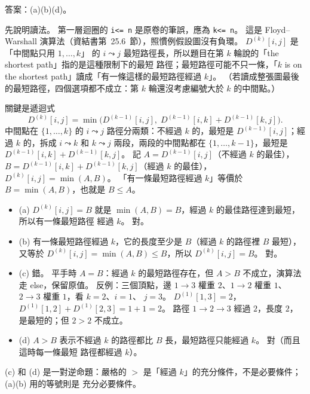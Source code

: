 \begin{pastsoln}
答案：(a)(b)(d)。

先說明讀法。 第一層迴圈的 \texttt{i<= n} 是原卷的筆誤，應為 \texttt{k<= n}。 這是 Floyd--Warshall
演算法（資結書第~25.6~節），照慣例假設圖沒有負環。 $D^{(k)}[i, j]$ 是「中間點只用 $1, \ldots, k$」
的 $i \leadsto j$ 最短路徑長，所以題目在第 $k$ 輪說的「the shortest path」指的是這種限制下的最短
路徑；最短路徑可能不只一條，「$k$ is on the shortest path」讀成「有一條這樣的最短路徑經過 $k$」。
（若讀成整張圖最後的最短路徑，四個選項都不成立：第 $k$ 輪還沒考慮編號大於 $k$ 的中間點。）

關鍵是遞迴式
\[
D^{(k)}[i, j] = \min\bigl(D^{(k-1)}[i, j],\; D^{(k-1)}[i, k] + D^{(k-1)}[k, j]\bigr).
\]
中間點在 $\{1, \ldots, k\}$ 的 $i \leadsto j$ 路徑分兩類：不經過 $k$ 的，最短是 $D^{(k-1)}[i, j]$；經過
$k$ 的，拆成 $i \leadsto k$ 和 $k \leadsto j$ 兩段，兩段的中間點都在 $\{1, \ldots, k-1\}$，最短是
$D^{(k-1)}[i, k] + D^{(k-1)}[k, j]$。 記 $A = D^{(k-1)}[i, j]$（不經過 $k$ 的最佳），
$B = D^{(k-1)}[i, k] + D^{(k-1)}[k, j]$（經過 $k$ 的最佳），$D^{(k)}[i, j] = \min(A, B)$。
「有一條最短路徑經過 $k$」等價於 $B = \min(A, B)$，也就是 $B \le A$。

\begin{itemize}
\item (a) $D^{(k)}[i, j] = B$ 就是 $\min(A, B) = B$，經過 $k$ 的最佳路徑達到最短，所以有一條最短路徑
經過 $k$。 對。
\item (b) 有一條最短路徑經過 $k$，它的長度至少是 $B$（經過 $k$ 的路徑裡 $B$ 最短），又等於
$D^{(k)}[i, j] = \min(A, B) \le B$，所以 $D^{(k)}[i, j] = B$。 對。
\item (c) 錯。 平手時 $A = B$：經過 $k$ 的最短路徑存在，但 $A > B$ 不成立，演算法走 else，保留原值。
反例：三個頂點，邊 $1 \to 3$ 權重 $2$、$1 \to 2$ 權重 $1$、$2 \to 3$ 權重 $1$，看 $k = 2$、$i = 1$、
$j = 3$。 $D^{(1)}[1, 3] = 2$，$D^{(1)}[1, 2] + D^{(1)}[2, 3] = 1 + 1 = 2$。 路徑 $1 \to 2 \to 3$ 經過
$2$，長度 $2$，是最短的；但 $2 > 2$ 不成立。
\item (d) $A > B$ 表示不經過 $k$ 的路徑都比 $B$ 長，最短路徑只能經過 $k$。 對（而且這時每一條最短
路徑都經過 $k$）。
\end{itemize}
(c) 和 (d) 是一對逆命題：嚴格的 $>$ 是「經過 $k$」的充分條件，不是必要條件；(a)(b) 用的等號則是
充分必要條件。
\end{pastsoln}
